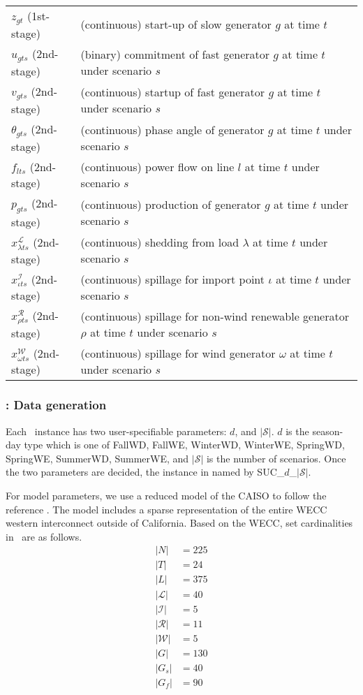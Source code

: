 \begin{table}[H]
{\begin{tabular}{ll}
			$z_{gt}$ (1st-stage)	&	(continuous) start-up of slow generator $g$ at time $t$\\
			$u_{gts}$ (2nd-stage)	&	(binary) commitment of fast generator $g$ at time $t$ under scenario $s$\\
			$v_{gts}$ (2nd-stage)	&	(continuous) startup of fast generator $g$ at time $t$ under scenario $s$\\
			$\theta_{gts}$ (2nd-stage)	&	(continuous) phase angle of generator $g$ at time $t$ under scenario $s$\\
			$f_{lts}$ (2nd-stage)	&	(continuous) power flow on line $l$ at time $t$ under scenario $s$\\
			$p_{gts}$ (2nd-stage)	&	(continuous) production of generator $g$ at time $t$ under scenario $s$\\
			$x_{\lambda ts}^\mathcal{L}$	(2nd-stage) & (continuous) shedding from load $\lambda$ at time $t$ under scenario $s$	\\
			$x_{\iota ts}^\mathcal{I}$	(2nd-stage) &	(continuous) spillage for import point $\iota$ at time $t$ under scenario $s$\\
			$x_{\rho ts}^\mathcal{R}$ (2nd-stage)	& (continuous) spillage for non-wind renewable generator $\rho$ at time $t$ under scenario $s$  	\\
			$x_{\omega ts}^\mathcal{W}$ (2nd-stage)	& (continuous) spillage for wind generator $\omega$ at time $t$ under scenario $s$ 	\\
			\hline
		\end{tabular}
	}
\end{table}

\subsubsection{\suc: Data generation}
Each \suc\ instance has two user-specifiable parameters: $d$, and $|\mathcal{S}|$. $d$ is the season-day type which is one of FallWD, FallWE, WinterWD, WinterWE, SpringWD, SpringWE, SummerWD, SummerWE, and $|\mathcal{S}|$ is the number of scenarios. Once the two parameters are decided, the instance in named by SUC\_$d$\_$|\mathcal{S}|$. 

For model parameters, we use a reduced model of the CAISO to follow the reference \cite{journal:PO2013}. The model includes a sparse representation of the entire WECC western interconnect outside of California. 
Based on the WECC, set cardinalities in \suc\ are as follows.
\begin{align*}
|N|&=225 \\
|T|&=24 \\
|L|&=375 \\
|\mathcal{L}|&=40\\
|\mathcal{I}|&=5\\
|\mathcal{R}|&=11\\
|\mathcal{W}|&=5\\
|G|&=130\\
|G_s|&=40\\
|G_f|&=90
\end{align*}

